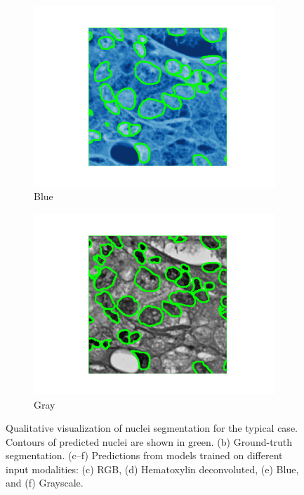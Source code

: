\documentclass[target=bach,aauheader=,style=]{thud}
\begin{document}
\begin{figure}[!htbp]
\begin{subfigure}{0.48\textwidth}
  \centering
  \includegraphics[width=\linewidth]{imgs/qualitative/medium/Blu/contour_img.png}
  \caption{Blue}
\end{subfigure}\hfill
\begin{subfigure}{0.48\textwidth}
  \centering
  \includegraphics[width=\linewidth]{imgs/qualitative/medium/Gray/contour_img.png}
  \caption{Gray}
\end{subfigure}

\caption{Qualitative visualization of nuclei segmentation for the typical case. 
Contours of predicted nuclei are shown in green. 
(b) Ground-truth segmentation. 
(c--f) Predictions from models trained on different input modalities: (c) RGB, (d) Hematoxylin deconvoluted, (e) Blue, and (f) Grayscale.}
\label{fig:qual_typical}
\end{figure}
\end{document}
